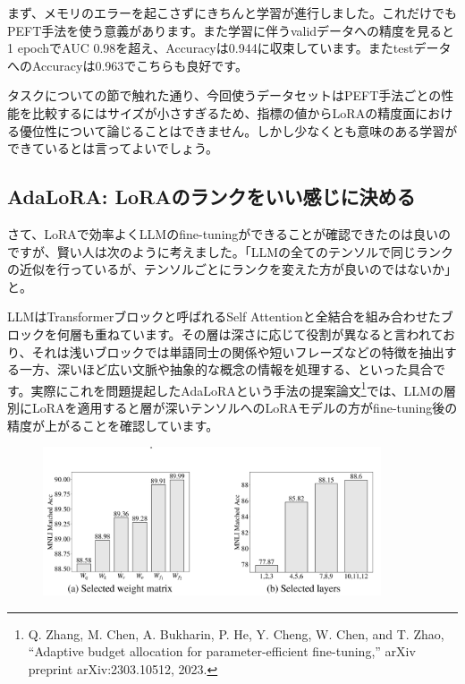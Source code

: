 \documentclass[a5paper,twoside,dvipdfmx]{jsarticle}
\begin{document}
まず、メモリのエラーを起こさずにきちんと学習が進行しました。これだけでもPEFT手法を使う意義があります。また学習に伴うvalidデータへの精度を見ると1 epochでAUC 0.98を超え、Accuracyは0.944に収束しています。またtestデータへのAccuracyは0.963でこちらも良好です。

タスクについての節で触れた通り、今回使うデータセットはPEFT手法ごとの性能を比較するにはサイズが小さすぎるため、指標の値からLoRAの精度面における優位性について論じることはできません。しかし少なくとも意味のある学習ができているとは言ってよいでしょう。

\subsection{AdaLoRA: LoRAのランクをいい感じに決める}

さて、LoRAで効率よくLLMのfine-tuningができることが確認できたのは良いのですが、賢い人は次のように考えました。「LLMの全てのテンソルで同じランクの近似を行っているが、テンソルごとにランクを変えた方が良いのではないか」と。

LLMはTransformerブロックと呼ばれるSelf Attentionと全結合を組み合わせたブロックを何層も重ねています。その層は深さに応じて役割が異なると言われており、それは浅いブロックでは単語同士の関係や短いフレーズなどの特徴を抽出する一方、深いほど広い文脈や抽象的な概念の情報を処理する、といった具合です。実際にこれを問題提起した\textsf{AdaLoRA}という手法の提案論文\footnote{Q. Zhang, M. Chen, A. Bukharin, P. He, Y. Cheng, W. Chen, and  T. Zhao, “Adaptive budget allocation for parameter-efficient fine-tuning,” arXiv preprint arXiv:2303.10512, 2023. }では、LLMの層別にLoRAを適用すると層が深いテンソルへのLoRAモデルの方がfine-tuning後の精度が上がることを確認しています。

\newpage

\begin{figure}[h]
  \centering
  \includegraphics[width=100mm]{../C105Fig/gray/adalora_layers.png}
 \end{figure} 
\end{document}
